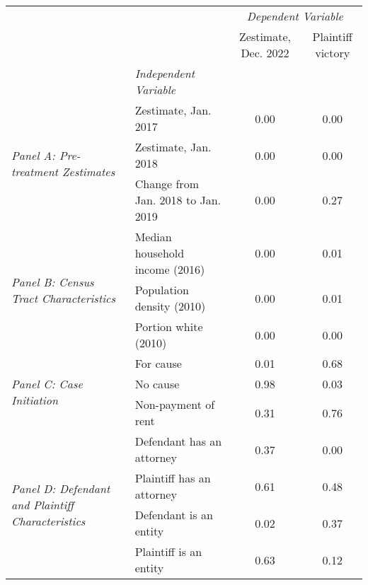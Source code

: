 \begin{tabular}{llcc}
\toprule
 &  & \multicolumn{2}{c}{\textit{Dependent Variable}} \\
 &  & Zestimate, Dec. 2022 & Plaintiff victory \\
 & \emph{Independent Variable} &  &  \\
\midrule
\multirow[c]{3}{3cm}{\textit{Panel A: Pre-treatment Zestimates}} & Zestimate, Jan. 2017 & 0.00 & 0.00 \\
 & Zestimate, Jan. 2018 & 0.00 & 0.00 \\
 & Change from Jan. 2018 to Jan. 2019 & 0.00 & 0.27 \\
\cline{1-4}
\multirow[c]{3}{3cm}{\textit{Panel B: Census Tract Characteristics}} & Median household income (2016) & 0.00 & 0.01 \\
 & Population density (2010) & 0.00 & 0.01 \\
 & Portion white (2010) & 0.00 & 0.00 \\
\cline{1-4}
\multirow[c]{3}{3cm}{\textit{Panel C: Case Initiation}} & For cause & 0.01 & 0.68 \\
 & No cause & 0.98 & 0.03 \\
 & Non-payment of rent & 0.31 & 0.76 \\
\cline{1-4}
\multirow[c]{4}{3cm}{\textit{Panel D: Defendant and Plaintiff Characteristics}} & Defendant has an attorney & 0.37 & 0.00 \\
 & Plaintiff has an attorney & 0.61 & 0.48 \\
 & Defendant is an entity & 0.02 & 0.37 \\
 & Plaintiff is an entity & 0.63 & 0.12 \\
\cline{1-4}
\bottomrule
\end{tabular}
